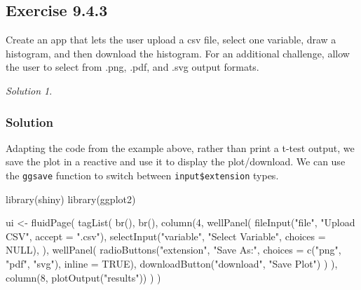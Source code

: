 \documentclass[
]{book}
\newenvironment{Shaded}{\begin{snugshade}}{\end{snugshade}}
\newcommand{\AttributeTok}[1]{\textcolor[rgb]{0.77,0.63,0.00}{#1}}
\newcommand{\ConstantTok}[1]{\textcolor[rgb]{0.00,0.00,0.00}{#1}}
\newcommand{\DecValTok}[1]{\textcolor[rgb]{0.00,0.00,0.81}{#1}}
\newcommand{\FunctionTok}[1]{\textcolor[rgb]{0.00,0.00,0.00}{#1}}
\newcommand{\NormalTok}[1]{#1}
\newcommand{\OtherTok}[1]{\textcolor[rgb]{0.56,0.35,0.01}{#1}}
\newcommand{\StringTok}[1]{\textcolor[rgb]{0.31,0.60,0.02}{#1}}
\theoremstyle{definition}
\theoremstyle{definition}
\theoremstyle{definition}
\theoremstyle{definition}
\theoremstyle{remark}
\newtheorem*{solution}{Solution}
\begin{document}
\hypertarget{exercise-9.4.3}{%
\subsection*{Exercise 9.4.3}\label{exercise-9.4.3}}

Create an app that lets the user upload a csv file, select one variable,
draw a histogram, and then download the histogram. For an additional challenge,
allow the user to select from .png, .pdf, and .svg output formats.

\begin{solution}
\leavevmode

\hypertarget{solution-27}{%
\subsubsection*{Solution}\label{solution-27}}

Adapting the code from the example above, rather than print a t-test output, we
save the plot in a reactive and use it to display the plot/download. We can use
the \texttt{ggsave} function to switch between \texttt{input\$extension} types.

\begin{Shaded}
\begin{Highlighting}[]
\FunctionTok{library}\NormalTok{(shiny)}
\FunctionTok{library}\NormalTok{(ggplot2)}

\NormalTok{ui }\OtherTok{\textless{}{-}} \FunctionTok{fluidPage}\NormalTok{(}
  \FunctionTok{tagList}\NormalTok{(}
    \FunctionTok{br}\NormalTok{(), }\FunctionTok{br}\NormalTok{(),}
    \FunctionTok{column}\NormalTok{(}\DecValTok{4}\NormalTok{,}
           \FunctionTok{wellPanel}\NormalTok{(}
             \FunctionTok{fileInput}\NormalTok{(}\StringTok{"file"}\NormalTok{, }\StringTok{"Upload CSV"}\NormalTok{, }\AttributeTok{accept =} \StringTok{".csv"}\NormalTok{),}
             \FunctionTok{selectInput}\NormalTok{(}\StringTok{"variable"}\NormalTok{, }\StringTok{"Select Variable"}\NormalTok{, }\AttributeTok{choices =} \ConstantTok{NULL}\NormalTok{),}
\NormalTok{           ),}
           \FunctionTok{wellPanel}\NormalTok{(}
             \FunctionTok{radioButtons}\NormalTok{(}\StringTok{"extension"}\NormalTok{, }\StringTok{"Save As:"}\NormalTok{,}
                          \AttributeTok{choices =} \FunctionTok{c}\NormalTok{(}\StringTok{"png"}\NormalTok{, }\StringTok{"pdf"}\NormalTok{, }\StringTok{"svg"}\NormalTok{), }\AttributeTok{inline =} \ConstantTok{TRUE}\NormalTok{),}
             \FunctionTok{downloadButton}\NormalTok{(}\StringTok{"download"}\NormalTok{, }\StringTok{"Save Plot"}\NormalTok{)}
\NormalTok{           )}
\NormalTok{    ),}
    \FunctionTok{column}\NormalTok{(}\DecValTok{8}\NormalTok{, }\FunctionTok{plotOutput}\NormalTok{(}\StringTok{"results"}\NormalTok{))}
\NormalTok{  )}
\NormalTok{)}


\end{Highlighting}
\end{Shaded}
\end{solution}
\end{document}

